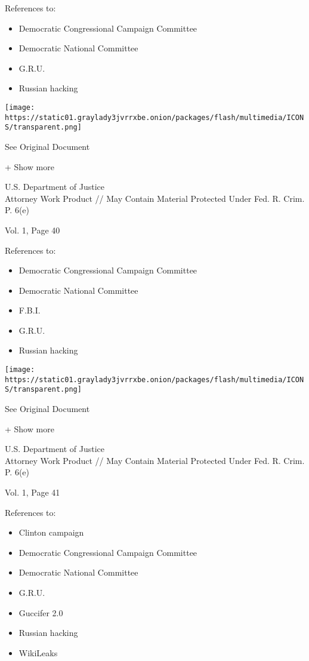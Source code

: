 References to:

\begin{itemize}
\tightlist
\item
  Democratic Congressional Campaign Committee
\item
  Democratic National Committee
\item
  G.R.U.
\item
  Russian hacking
\end{itemize}

\protect\hyperlink{}{}

\texttt{[image: https://static01.graylady3jvrrxbe.onion/packages/flash/multimedia/ICONS/transparent.png]}

See Original Document

+ Show more

U.S. Department of Justice\\
Attorney Work Product // May Contain Material Protected Under Fed. R.
Crim. P. 6(e)

Vol. 1, Page 40

References to:

\begin{itemize}
\tightlist
\item
  Democratic Congressional Campaign Committee
\item
  Democratic National Committee
\item
  F.B.I.
\item
  G.R.U.
\item
  Russian hacking
\end{itemize}

\protect\hyperlink{}{}

\texttt{[image: https://static01.graylady3jvrrxbe.onion/packages/flash/multimedia/ICONS/transparent.png]}

See Original Document

+ Show more

U.S. Department of Justice\\
Attorney Work Product // May Contain Material Protected Under Fed. R.
Crim. P. 6(e)

Vol. 1, Page 41

References to:

\begin{itemize}
\tightlist
\item
  Clinton campaign
\item
  Democratic Congressional Campaign Committee
\item
  Democratic National Committee
\item
  G.R.U.
\item
  Guccifer 2.0
\item
  Russian hacking
\item
  WikiLeaks
\end{itemize}


